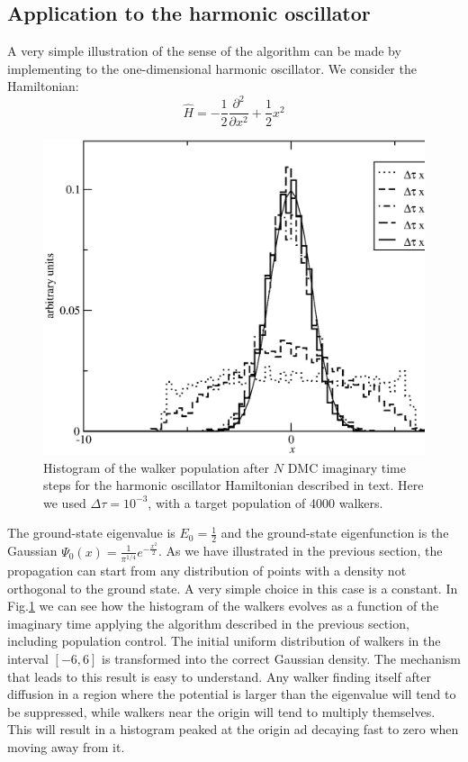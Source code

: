 \subsection{Application to the harmonic oscillator}

A very simple illustration of the sense of the algorithm can be made by implementing to the one-dimensional harmonic oscillator. We consider the Hamiltonian:
\begin{equation}
\hat{H}=-\frac{1}{2}\frac{\partial^2}{\partial x^2}+\frac{1}{2}x^2
\end{equation}
\begin{figure}
	\begin{center}
		\includegraphics[scale=0.5]{Chapter9-figures/hists.eps}
	\end{center}
	\caption{Histogram of the walker population after $N$ DMC imaginary time steps for the harmonic oscillator Hamiltonian described in text. Here we used $\Delta\tau=10^{-3}$, with a target population of 4000 walkers.}
	\label{fig.hist}
\end{figure}
The ground-state eigenvalue is $E_0=\tfrac{1}{2}$ and the ground-state eigenfunction is the Gaussian $\Psi_0(x)=\frac{1}{\pi^{1/4}}e^{-\frac{x^2}{2}}$. As we have illustrated in the previous section, the propagation can start from any distribution of points with a density not orthogonal to the ground state. A very simple choice in this case is a constant. In Fig.\ref{fig.hist} we can see how the histogram of the walkers evolves as a function of the imaginary time applying the algorithm described in the previous section, including population control. The initial uniform distribution of walkers in the interval $[-6,6]$ is transformed into the correct Gaussian density. The mechanism that leads to this result is easy to understand. Any walker finding itself after diffusion in a region where the potential is larger than the eigenvalue will tend to be suppressed, while walkers near the origin will tend to multiply themselves. This will result in a histogram peaked at the origin ad decaying fast to zero when moving away from it.
